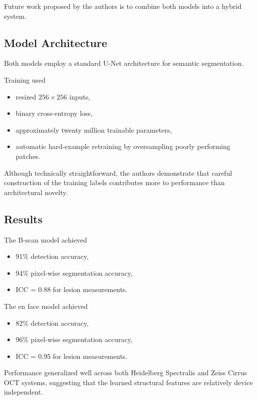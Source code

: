\documentclass[11pt]{article}
\begin{document}
Future work proposed by the authors is to combine both models into a hybrid system.

\subsection{Model Architecture}

Both models employ a standard U-Net architecture for semantic segmentation.

Training used

\begin{itemize}
    \item resized $256\times256$ inputs,
    \item binary cross-entropy loss,
    \item approximately twenty million trainable parameters,
    \item automatic hard-example retraining by oversampling poorly performing patches.
\end{itemize}

Although technically straightforward, the authors demonstrate that careful construction of the training labels contributes more to performance than architectural novelty.

\subsection{Results}

The B-scan model achieved

\begin{itemize}
    \item 91\% detection accuracy,
    \item 94\% pixel-wise segmentation accuracy,
    \item ICC = 0.88 for lesion measurements.
\end{itemize}

The en face model achieved

\begin{itemize}
    \item 82\% detection accuracy,
    \item 96\% pixel-wise segmentation accuracy,
    \item ICC = 0.95 for lesion measurements.
\end{itemize}

Performance generalized well across both Heidelberg Spectralis and Zeiss Cirrus OCT systems, suggesting that the learned structural features are relatively device independent.
\end{document}
